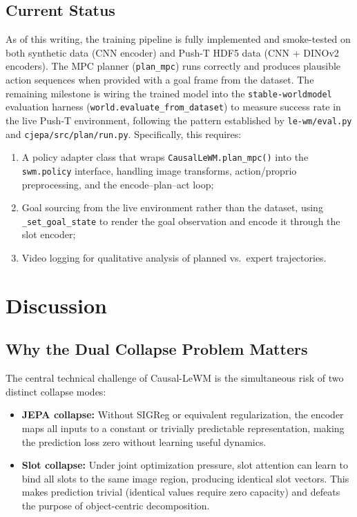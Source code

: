 \documentclass[12pt]{article}
\begin{document}
\subsection{Current Status}

As of this writing, the training pipeline is fully implemented and smoke-tested on both synthetic data (CNN encoder) and Push-T HDF5 data (CNN + DINOv2 encoders). The MPC planner (\texttt{plan\_mpc}) runs correctly and produces plausible action sequences when provided with a goal frame from the dataset. The remaining milestone is wiring the trained model into the \texttt{stable-worldmodel} evaluation harness (\texttt{world.evaluate\_from\_dataset}) to measure success rate in the live Push-T environment, following the pattern established by \texttt{le-wm/eval.py} and \texttt{cjepa/src/plan/run.py}. Specifically, this requires:

\begin{enumerate}[label=(\roman*)]
    \item A policy adapter class that wraps \texttt{CausalLeWM.plan\_mpc()} into the \texttt{swm.policy} interface, handling image transforms, action/proprio preprocessing, and the encode--plan--act loop;
    \item Goal sourcing from the live environment rather than the dataset, using \texttt{\_set\_goal\_state} to render the goal observation and encode it through the slot encoder;
    \item Video logging for qualitative analysis of planned vs.\ expert trajectories.
\end{enumerate}

\section{Discussion}

\subsection{Why the Dual Collapse Problem Matters}

The central technical challenge of Causal-LeWM is the simultaneous risk of two distinct collapse modes:

\begin{itemize}[leftmargin=*]
    \item \textbf{JEPA collapse:} Without SIGReg or equivalent regularization, the encoder maps all inputs to a constant or trivially predictable representation, making the prediction loss zero without learning useful dynamics.
    \item \textbf{Slot collapse:} Under joint optimization pressure, slot attention can learn to bind all slots to the same image region, producing identical slot vectors. This makes prediction trivial (identical values require zero capacity) and defeats the purpose of object-centric decomposition.
\end{itemize}
\end{document}
